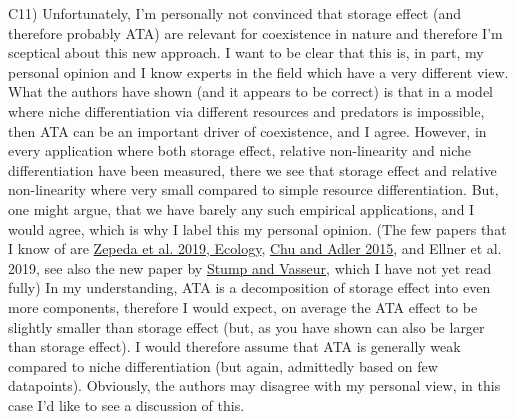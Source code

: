 \documentclass[letterpaper,11pt]{article}
\begin{document}
\noindent C11) Unfortunately, I’m personally not convinced that storage effect (and therefore probably ATA) are relevant for coexistence in nature and therefore I’m sceptical about this new approach. I want to be clear that this is, in part, my personal opinion and I know experts in the field which have a very different view. What the authors have shown (and it appears to be correct) is that in a model where niche differentiation via different resources and predators is impossible, then ATA can be an important driver of coexistence, and I agree. However, in every application where both storage effect, relative non-linearity and niche differentiation have been measured, there we see that storage effect and relative non-linearity where very small compared to simple resource differentiation. But, one might argue, that we have barely any such empirical applications, and I would agree, which is why I label this my personal opinion. (The few papers that I know of are \href{https://nam10.safelinks.protection.outlook.com/?url=https%3A%2F%2Fdoi.org%2F10.1002%2Fecy.2726&data=05%7C01%7Cd294r143%40ku.edu%7C13ab816eaf2a49c27ea808db784a67cf%7C3c176536afe643f5b96636feabbe3c1a%7C0%7C0%7C638236033192197676%7CUnknown%7CTWFpbGZsb3d8eyJWIjoiMC4wLjAwMDAiLCJQIjoiV2luMzIiLCJBTiI6Ik1haWwiLCJXVCI6Mn0%3D%7C3000%7C%7C%7C&sdata=HbUTjzCNQrvGSARY5u3Eqme88DbKiNyiAVNOUGzjcbE%3D&reserved=0}{Zepeda et al. 2019, Ecology}, \href{https://nam10.safelinks.protection.outlook.com/?url=https%3A%2F%2Fdoi.org%2F10.1890%2F14-1741.1&data=05%7C01%7Cd294r143%40ku.edu%7C13ab816eaf2a49c27ea808db784a67cf%7C3c176536afe643f5b96636feabbe3c1a%7C0%7C0%7C638236033192197676%7CUnknown%7CTWFpbGZsb3d8eyJWIjoiMC4wLjAwMDAiLCJQIjoiV2luMzIiLCJBTiI6Ik1haWwiLCJXVCI6Mn0%3D%7C3000%7C%7C%7C&sdata=KKIBuLjBN2vNGWfEpduAGGrMAt7ov9a4F53CmlZQlO0%3D&reserved=0}{Chu and Adler 2015}, and Ellner et al. 2019, see also the new paper by \href{https://nam10.safelinks.protection.outlook.com/?url=https%3A%2F%2Fesajournals.onlinelibrary.wiley.com%2Fdoi%2Fepdf%2F10.1002%2Fecm.1585&data=05%7C01%7Cd294r143%40ku.edu%7C13ab816eaf2a49c27ea808db784a67cf%7C3c176536afe643f5b96636feabbe3c1a%7C0%7C0%7C638236033192197676%7CUnknown%7CTWFpbGZsb3d8eyJWIjoiMC4wLjAwMDAiLCJQIjoiV2luMzIiLCJBTiI6Ik1haWwiLCJXVCI6Mn0%3D%7C3000%7C%7C%7C&sdata=YaqsZ6axu6rYV12kh9IiRIbES7ZUMWIN7HXgB08iPzc%3D&reserved=0}{Stump and Vasseur}, which I have not yet read fully) In my understanding, ATA is a decomposition of storage effect into even more components, therefore I would expect, on average the ATA effect to be slightly smaller than storage effect (but, as you have shown can also be larger than storage effect). I would therefore assume that ATA is generally weak compared to niche differentiation (but again, admittedly based on few datapoints). Obviously, the authors may disagree with my personal view, in this case I’d like to see a discussion of this. \\
\end{document}
